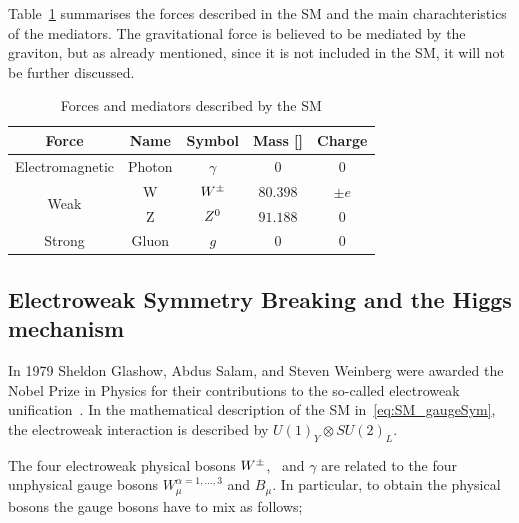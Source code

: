 			Table~\ref{tab:interactions} summarises the forces described in the \ac{SM} and the main charachteristics of the mediators. The gravitational force is believed to be mediated by the graviton, but as already mentioned, since it is not included in the \ac{SM}, it will not be further discussed.

			\begin{table}[!htb]\centering\caption{Forces and mediators described by the \ac{SM}}							
				\begin{tabular}{c|c|c|c|c}
					\hline \hline
					\textbf{Force} & \textbf{Name} & \textbf{Symbol} & \textbf{Mass} [\GeV]& \textbf{Charge} \\ \hline \hline
					Electromagnetic & Photon & $\gamma$ & 0 & 0 \\ \hline
					\multirow{2}{*}{Weak} & W & $W^{\pm}$ & $80.398$ & $\pm e$ \\
					& Z & $Z^0$ & $91.188$ & 0 \\\hline
					Strong & Gluon & $g$ & $0$ & $0$ \\\hline\hline
				\end{tabular}						
			\label{tab:interactions} 
			\end{table}



		\subsection{Electroweak Symmetry Breaking and the Higgs mechanism}
		\label{sec:ewksb}

			In 1979 Sheldon Glashow, Abdus Salam, and Steven Weinberg were awarded the Nobel Prize in Physics for their contributions to the so-called electroweak unification~\cite{Glashow:1961tr,SALAM1964168,PhysRevLett.19.1264}. In the mathematical description of the \ac{SM} in~\ref{eq:SM_gaugeSym}, the electroweak interaction is described by $U(1)_Y \otimes SU(2)_L$. 

			The four electroweak physical bosons $W^{\pm}$, \Zboson\ and $\gamma$ are related to the four unphysical gauge bosons $W_{\mu}^{\alpha = 1,\dots,3}$ and $B_\mu$. In particular, to obtain the physical bosons the gauge bosons have to mix as follows;


